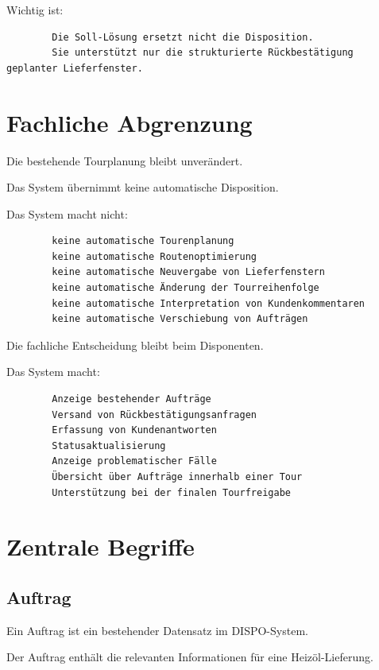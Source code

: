 \documentclass[12pt,a4paper]{article}
\begin{document}
	Wichtig ist:
	
	\begin{lstlisting}
		Die Soll-Lösung ersetzt nicht die Disposition.
		Sie unterstützt nur die strukturierte Rückbestätigung geplanter Lieferfenster.
	\end{lstlisting}
	
	\section{Fachliche Abgrenzung}
	
	Die bestehende Tourplanung bleibt unverändert.
	
	Das System übernimmt keine automatische Disposition.
	
	Das System macht nicht:
	
	\begin{lstlisting}
		keine automatische Tourenplanung
		keine automatische Routenoptimierung
		keine automatische Neuvergabe von Lieferfenstern
		keine automatische Änderung der Tourreihenfolge
		keine automatische Interpretation von Kundenkommentaren
		keine automatische Verschiebung von Aufträgen
	\end{lstlisting}
	
	Die fachliche Entscheidung bleibt beim Disponenten.
	
	Das System macht:
	
	\begin{lstlisting}
		Anzeige bestehender Aufträge
		Versand von Rückbestätigungsanfragen
		Erfassung von Kundenantworten
		Statusaktualisierung
		Anzeige problematischer Fälle
		Übersicht über Aufträge innerhalb einer Tour
		Unterstützung bei der finalen Tourfreigabe
	\end{lstlisting}
	
	\section{Zentrale Begriffe}
	
	\subsection{Auftrag}
	
	Ein Auftrag ist ein bestehender Datensatz im DISPO-System.
	
	Der Auftrag enthält die relevanten Informationen für eine Heizöl-Lieferung.
	
\end{document}

